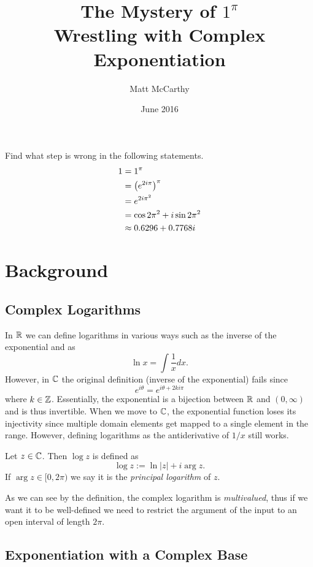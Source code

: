 \documentclass[notitlepage]{problem-solving}
\title{The Mystery of $1^\pi$\\ Wrestling with Complex Exponentiation}
\author{Matt McCarthy}
\date{June 2016}
\begin{document}
\maketitle

\begin{problem*}
	Find what step is wrong in the following statements.
	\begin{align*}
		1 &= 1^\pi\\
		&= \left( e^{2i\pi} \right)^\pi\\
		&=e^{2i\pi^2}\\
		&=\cos 2\pi^2 + i\sin 2\pi^2\\
		&\approx 0.6296 +0.7768 i
	\end{align*}
\end{problem*}

\section{Background}

\subsection{Complex Logarithms}

In $\mathbb{R}$ we can define logarithms in various ways such as the inverse of the exponential and as
\[
	\ln x = \int \frac{1}{x} dx.
\]
However, in $\mathbb{C}$ the original definition (inverse of the exponential) fails since
\[
	e^{i\theta} = e^{i\theta + 2ki\pi}
\]
where $k\in\mathbb{Z}$.
Essentially, the exponential is a bijection between $\mathbb{R}$ and $(0,\infty)$ and is thus invertible.
When we move to $\mathbb{C}$, the exponential function loses its injectivity since multiple domain elements get mapped to a single element in the range.
However, defining logarithms as the antiderivative of $1/x$ still works.
\begin{definition}
	Let $z\in\mathbb{C}$.
	Then $\log z$ is defined as
	\[
		\log z := \ln |z| +i\arg z.
	\]
	If $\arg z\in[0,2\pi)$ we say it is the \textit{principal logarithm} of $z$.
\end{definition}
As we can see by the definition, the complex logarithm is \textit{multivalued}, thus if we want it to be well-defined we need to restrict the argument of the input to an open interval of length $2\pi$.

\subsection{Exponentiation with a Complex Base}
\end{document}

